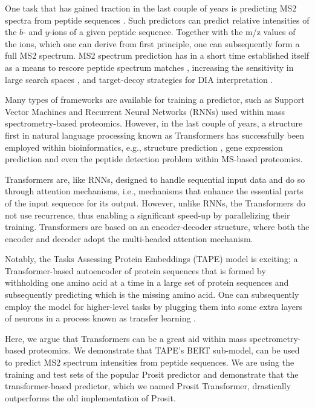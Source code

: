 \documentclass[10pt,a4paper]{article}
\begin{document}
One task that has gained traction in the last couple of years is predicting MS2 spectra from peptide sequences \cite{Degroeve2015-fh,Gessulat2019-el}. Such predictors can predict relative intensities of the $b$- and $y$-ions of a given peptide sequence. Together with the m/z values of the ions, which one can derive from first principle, one can subsequently form a full MS2 spectrum. MS2 spectrum prediction has in a short time established itself as a means to rescore peptide spectrum matches \cite{C_Silva2019-ja}, increasing the sensitivity in large search spaces \cite{Wilhelm2021-mz}, and target-decoy strategies for DIA interpretation \cite{Searle2020-yk}.

Many types of frameworks are available for training a predictor, such as Support Vector Machines and Recurrent Neural Networks (RNNs) used within mass spectrometry-based proteomics. However, in the last couple of years, a structure first in natural language processing \cite{devlin2018bert} known as Transformers \cite{Vaswani2017-sy} has successfully been employed within bioinformatics, e.g., structure prediction \cite{Rao2019-qq,Bepler2021-ci}, gene expression prediction\cite{avsec2021effective} and even the peptide detection problem within MS-based proteomics\cite{cheng2021pepformer}.

Transformers are, like RNNs, designed to handle sequential input data and do so through attention mechanisms, i.e., mechanisms that enhance the essential parts of the input sequence for its output. However, unlike RNNs, the Transformers do not use recurrence, thus enabling a significant speed-up by parallelizing their training. Transformers are based on an encoder-decoder structure, where both the encoder and decoder adopt the multi-headed attention mechanism\cite{Vaswani2017-sy}.

Notably, the Tasks Assessing Protein Embeddings (TAPE) model \cite{Rao2019-qq} is exciting; a Transformer-based autoencoder of protein sequences that is formed by withholding one amino acid at a time in a large set of protein sequences and subsequently predicting which is the missing amino acid. One can subsequently employ the model for higher-level tasks by plugging them into some extra layers of neurons in a process known as transfer learning \cite{Rao2019-qq,Bepler2021-ci}.

Here, we argue that Transformers can be a great aid within mass spectrometry-based proteomics. We demonstrate that TAPE’s BERT sub-model, can be used to predict MS2 spectrum intensities from peptide sequences. We are using the training and test sets of the popular Prosit \cite{Gessulat2019-el} predictor and demonstrate that the transformer-based predictor, which we named Prosit Transformer, drastically outperforms the old implementation of Prosit.
\end{document}
